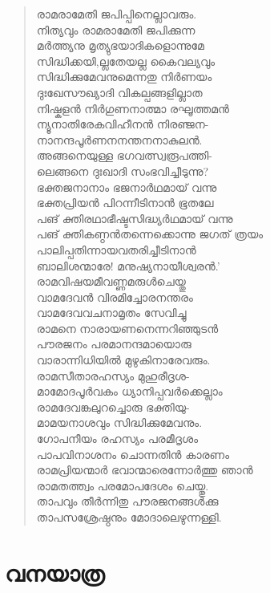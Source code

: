 \begin{verse}
രാമരാമേതി ജപിപ്പിനെല്ലാവരും.\\
നിത്യവും രാമരാമേതി ജപിക്കുന്ന\\
മര്‍ത്ത്യനു മൃത്യുഭയാദികളൊന്നുമേ\\
സിദ്ധിക്കയി,ല്ലതേയല്ല കൈവല്യവും\\
സിദ്ധിക്കുമേവനുമെന്നതു നിര്‍ണയം\\
ദുഃഖേസൗഖ്യാദി വികല്പങ്ങളില്ലാത\\
നിഷ്കളന്‍ നിര്‍ഗുണനാത്മാ രഘൂത്തമന്‍\\
ന്യൂനാതിരേകവിഹീനന്‍ നിരഞ്ജന-\\
നാനന്ദപൂര്‍ണനനന്തനനാകുലന്‍.\\
അങ്ങനെയുള്ള ഭഗവത്സ്വരൂപത്തി-\\
ലെങ്ങനെ ദുഃഖാദി സംഭവിച്ചീടുന്നു?\\
ഭക്തജനാനാം ഭജനാര്‍ഥമായ് വന്നു\\
ഭക്തപ്രിയന്‍ പിറന്നീടിനാന്‍ ഭൂതലേ\\
പങ് ക്തിരഥാഭീഷ്ടസിദ്ധ്യര്‍ഥമായ് വന്നു\\
പങ് ക്തികണ്ഠന്‍തന്നെക്കൊന്നു ജഗത് ത്രയം\\
പാലിപ്പതിന്നായവതരിച്ചീടിനാന്‍\\
ബാലിശന്മാരേ! മനുഷ്യനായീശ്വരന്‍.’\\
രാമവിഷയമീവണ്ണമരുള്‍ചെയ്തു\\
വാമദേവന്‍ വിരമിച്ചോരനന്തരം\\
വാമദേവവചനാമൃതം സേവിച്ചു\\
രാമനെ നാരായണനെന്നറിഞ്ഞുടന്‍\\
പൗരജനം പരമാനന്ദമായൊരു\\
വാരാന്നിധിയില്‍ മുഴുകിനാരേവരും.\\
രാമസീതാരഹസ്യം മുഹുരീദൃശ-\\
മാമോദപൂര്‍വകം ധ്യാനിപ്പവര്‍ക്കെല്ലാം\\
രാമദേവങ്കലുറച്ചൊരു ഭക്തിയു-\\
മാമയനാശവും സിദ്ധിക്കുമേവനും.\\
ഗോപനീയം രഹസ്യം പരമീദൃശം\\
പാപവിനാശനം ചൊന്നതിന്‍ കാരണം\\
രാമപ്രിയന്മാര്‍ ഭവാന്മാരെന്നോര്‍ത്തു ഞാന്‍\\
രാമതത്ത്വം പരമോപദേശം ചെയ്തു.\\
താപവും തീര്‍ന്നിതു പൗരജനങ്ങള്‍ക്കു\\
താപസശ്രേഷ്ഠനും മോദാലെഴുന്നള്ളി.
\end{verse}


\section{വനയാത്ര}

